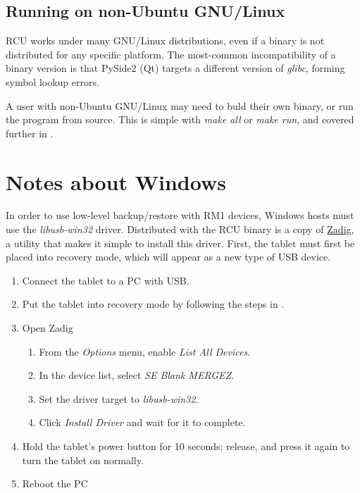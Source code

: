\documentclass{memoir}
\begin{document}
{\subsection{Running on non-Ubuntu GNU/Linux}
RCU works under many GNU/Linux distributions, even if a binary is not distributed for any specific platform. The most-common incompatibility of a binary version is that PySide2 (Qt) targets a different version of \textit{glibc}, forming symbol lookup errors.

A user with non-Ubuntu GNU/Linux may need to buld their own binary, or run the program from source. This is simple with \textit{make all} or \textit{make run}, and covered further in .


\newpage
\section{Notes about Windows}
\label{sec:winnotes}
In order to use low-level backup/restore with RM1 devices, Windows hosts must use the \textit{libusb-win32} driver. Distributed with the RCU binary is a copy of \href{https://zadig.akeo.ie/}{Zadig}, a utility that makes it simple to install this driver. First, the tablet must first be placed into recovery mode, which will appear as a new type of USB device.

\begin{enumerate}
  \item{Connect the tablet to a PC with USB.}
\item{Put the tablet into recovery mode by following the steps in .}
\item{Open Zadig}
  \begin{enumerate}
  \item{From the \textit{Options} menu, enable \textit{List All Devices}.}
  \item{In the device list, select \textit{SE Blank MERGEZ}.}
  \item{Set the driver target to \textit{libusb-win32}.}
  \item{Click \textit{Install Driver} and wait for it to complete.}
  \end{enumerate}
\item{Hold the tablet's power button for 10 seconds; release, and press it again to turn the tablet on normally.}
\item{Reboot the PC}
\end{enumerate}

\vfill

}
\end{document}
